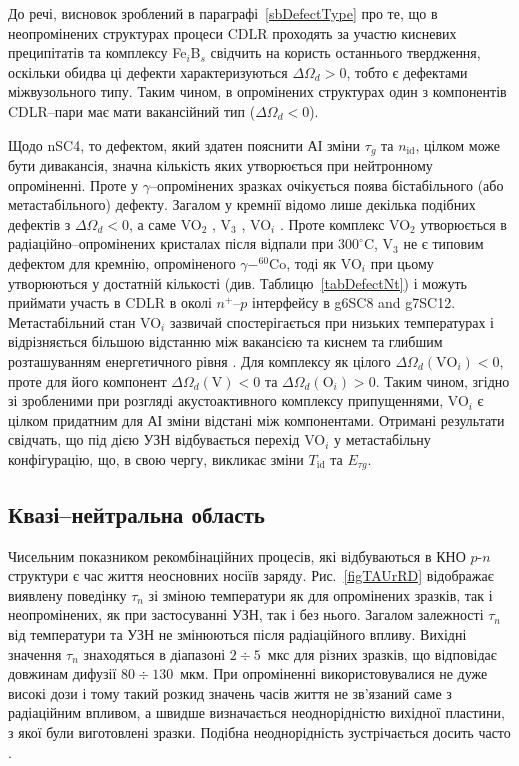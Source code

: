 До речі, висновок зроблений в параграфі~\ref{sbDefectType} про те, що
в неопромінених структурах процеси CDLR проходять за участю кисневих преципітатів та комплексу Fe$_i$B$_s$ свідчить на користь
останнього твердження, оскільки обидва ці дефекти характеризуються $\Delta\Omega_d>0$, тобто є дефектами міжвузольного типу.
Таким чином, в опромінених структурах один з компонентів CDLR--пари
має мати вакансійний тип ($\Delta\Omega_d<0$).

Щодо nSC4, то дефектом, який здатен пояснити АІ зміни $\tau_g$ та $n_\mathrm{id}$, цілком може бути дивакансія,
значна кількість яких утворюється при нейтронному опроміненні.
Проте у $\gamma$--опромінених зразках очікується поява бістабільного (або метастабільного) дефекту.
Загалом у кремнії відомо лише декілька подібних дефектів з $\Delta\Omega_d<0$, а саме
 VO$_2$ \cite{FTP:Murin},
 V$_3$ \cite{V3:Markevich},
 VO$_i$ \cite{MetaUFN}.
Проте комплекс VO$_2$ утворюється в радіаційно--опромінених кристалах після відпали при $300^\circ$C,
V$_3$ не є типовим дефектом для кремнію, опроміненого $\gamma-^{60}$Co,
тоді як VO$_i$ при цьому утворюються у достатній кількості (див. Таблицю~\ref{tabDefectNt}) і можуть приймати
участь в CDLR в околі $n^+$--$p$ інтерфейсу в g6SC8 and g7SC12.
Метастабільний стан VO$_i$ зазвичай спостерігається при низьких температурах
і відрізняється більшою відстанню між вакансією та киснем та глибшим розташуванням енергетичного рівня \cite{MetaUFN}.
Для комплексу як цілого $\Delta\Omega_d(\mbox{VO}_i)<0$,
проте для його компонент $\Delta\Omega_d(\mbox{V})<0$ та $\Delta\Omega_d(\mbox{O}_i)>0$.
Таким чином, згідно зі зробленими при розгляді акустоактивного комплексу припущеннями,
VO$_i$ є цілком придатним для АІ зміни відстані між компонентами.
Отримані результати свідчать, що під дією УЗН  відбувається
перехід VO$_i$ у метастабільну конфігурацію, що, в свою чергу,
викликає зміни $T_{\mathrm{id}}$ та $E_{\tau g}$.





\subsection{Квазі--нейтральна область\label{sbRadDef}}

Чисельним показником рекомбінаційних процесів, які відбуваються в КНО $p$-$n$ структури є
час життя неосновних носіїв заряду.
Рис.~\ref{figTAUrRD} відображає виявлену поведінку $\tau_n$ зі зміною температури як для опромінених зразків,
так і неопромінених, як при застосуванні УЗН, так і без нього.
Загалом залежності $\tau_n$ від температури та УЗН не змінюються після радіаційного впливу.
Вихідні значення $\tau_n$ знаходяться в діапазоні $2\div5$~мкс для різних зразків,
що відповідає довжинам дифузії $80\div130$~мкм.
При опроміненні використовувалися не дуже високі дози і тому
такий розкид значень часів життя не зв'язаний саме з радіаційним впливом,
а швидше визначається неоднорідністю вихідної пластини, з якої були виготовлені зразки.
Подібна неоднорідність зустрічається досить часто \cite{Oxide:Chen,Oxide_Schon}.


